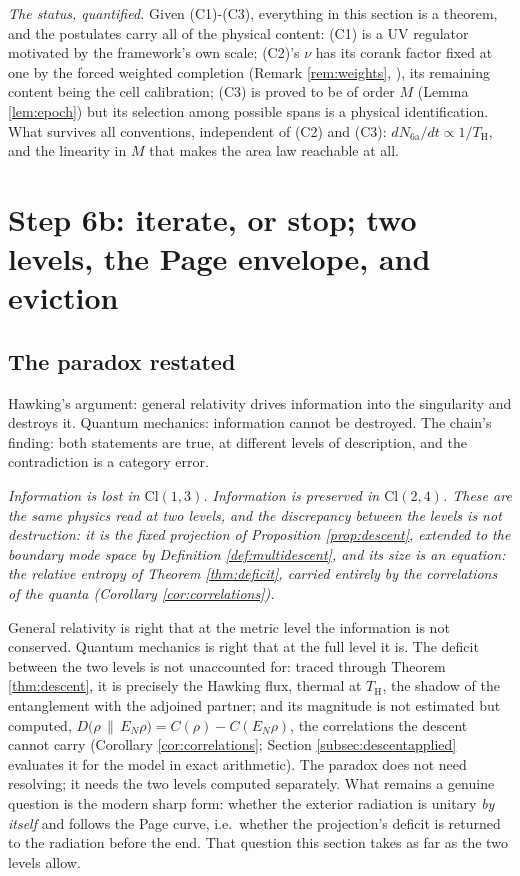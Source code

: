 \documentclass[11pt]{article}
\theoremstyle{definition}
\newcommand{\Cl}{\mathrm{Cl}}
\renewcommand{\TH}{T_{\mathrm{H}}} %
\newcommand{\EN}{E_{N}}
\newcommand{\rel}[2]{D\bigl(#1 \,\|\, #2\bigr)}
\begin{document}
\emph{The status, quantified.} Given (C1)-(C3), everything in this section is a theorem, and the postulates carry all of the physical content: (C1) is a UV regulator motivated by the framework's own scale; (C2)'s $\nu$ has its corank factor fixed at one by the forced weighted completion (Remark \ref{rem:weights}, \cite[\S 8.9]{ButlerT4}), its remaining content being the cell calibration; (C3) is proved to be of order $M$ (Lemma \ref{lem:epoch}) but its selection among possible spans is a physical identification. What survives all conventions, independent of (C2) and (C3): $dN_{\mathrm{6a}}/dt \propto 1/\TH$, and the linearity in $M$ that makes the area law reachable at all.

\section{Step 6b: iterate, or stop; two levels, the Page envelope, and eviction}\label{sec:page}

\subsection{The paradox restated}\label{subsec:restated}

Hawking's argument: general relativity drives information into the singularity and destroys it. Quantum mechanics: information cannot be destroyed. The chain's finding: both statements are true, at different levels of description, and the contradiction is a category error.

\begin{center}
\emph{Information is lost in $\Cl(1,3)$. Information is preserved in $\Cl(2,4)$. These are the same physics read at two levels, and the discrepancy between the levels is not destruction: it is the fixed projection of Proposition \ref{prop:descent}, extended to the boundary mode space by Definition \ref{def:multidescent}, and its size is an equation: the relative entropy of Theorem \ref{thm:deficit}, carried entirely by the correlations of the quanta (Corollary \ref{cor:correlations}).}
\end{center}

General relativity is right that at the metric level the information is not conserved. Quantum mechanics is right that at the full level it is. The deficit between the two levels is not unaccounted for: traced through Theorem \ref{thm:descent}, it is precisely the Hawking flux, thermal at $\TH$, the shadow of the entanglement with the adjoined partner; and its magnitude is not estimated but computed, $\rel{\rho}{\EN\rho} = C(\rho) - C(\EN\rho)$, the correlations the descent cannot carry (Corollary \ref{cor:correlations}; Section \ref{subsec:descentapplied} evaluates it for the model in exact arithmetic). The paradox does not need resolving; it needs the two levels computed separately. What remains a genuine question is the modern sharp form: whether the exterior radiation is unitary \emph{by itself} and follows the Page curve, i.e.\ whether the projection's deficit is returned to the radiation before the end. That question this section takes as far as the two levels allow.
\end{document}
